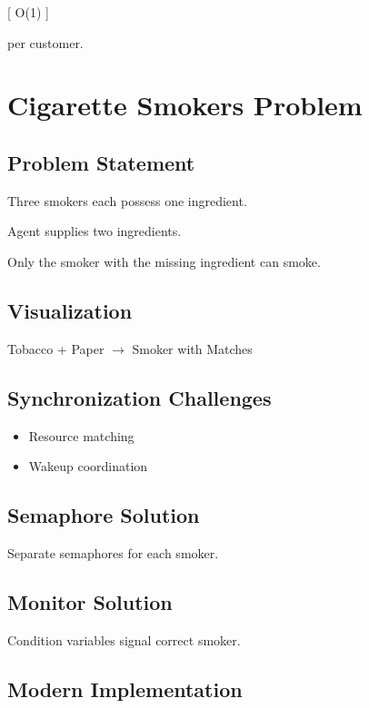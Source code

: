 [
O(1)
]

per customer.

\section{Cigarette Smokers Problem}

\subsection{Problem Statement}

Three smokers each possess one ingredient.

Agent supplies two ingredients.

Only the smoker with the missing ingredient can smoke.

\subsection{Visualization}

\begin{center}
Tobacco + Paper $\rightarrow$ Smoker with Matches
\end{center}

\subsection{Synchronization Challenges}

\begin{itemize}
\item Resource matching
\item Wakeup coordination
\end{itemize}

\subsection{Semaphore Solution}

Separate semaphores for each smoker.

\subsection{Monitor Solution}

Condition variables signal correct smoker.

\subsection{Modern Implementation}

